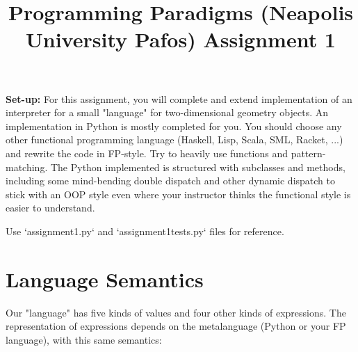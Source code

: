 \documentclass[a4paper,12pt]{article}
\title{Programming Paradigms (Neapolis University Pafos) Assignment 1}
\begin{document}
\maketitle
\textbf{Set-up:} For this assignment, you will complete and extend implementation of an interpreter for a small "language" for two-dimensional geometry objects. An implementation in Python is mostly completed for you. You should choose any other functional programming language (Haskell, Lisp, Scala, SML, Racket, ...) and rewrite the code in FP-style. Try to heavily use functions and pattern-matching. The Python implemented is structured with subclasses and methods, including some mind-bending double dispatch and other dynamic dispatch to stick with an OOP style even where your instructor thinks the functional style is easier to understand.

Use `assignment1.py` and `assignment1tests.py` files for reference.

\section*{Language Semantics}
Our "language" has five kinds of values and four other kinds of expressions. The representation of expressions depends on the metalanguage (Python or your FP language), with this same semantics:
\end{document}

